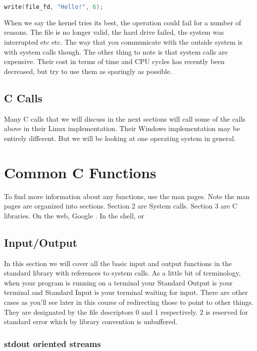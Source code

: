 \begin{lstlisting}[language=C]
write(file_fd, "Hello!", 6);
\end{lstlisting}

When we say the kernel tries its best, the operation could fail for a number of reasons. The file is no longer valid, the hard drive failed, the system was interrupted etc etc.
The way that you communicate with the outside system is with system calls though.
The other thing to note is that system calls are expensive.
Their cost in terms of time and CPU cycles has recently been decreased, but try to use them as sparingly as possible.

\subsection{C Calls}

Many C calls that we will discuss in the next sections will call some of the calls above in their Linux implementation.
Their Windows implementation may be entirely different.
But we will be looking at one operating system in general.

\section{Common C Functions}

To find more information about any functions, use the man pages. Note the man pages are organized into sections. Section 2 are System calls. Section 3 are C libraries. On the web, Google . In the shell,  or 

\subsection{Input/Output}

In this section we will cover all the basic input and output functions in the standard library with references to system calls.
As a little bit of terminology, when your program is running on a terminal your Standard Output is your terminal and Standard Input is your terminal waiting for input.
There are other cases as you'll see later in this course of redirecting those to point to other things.
They are designated by the file descriptors 0 and 1 respectively. 2 is reserved for standard error which by library convention is unbuffered.

\subsubsection{stdout oriented streams}


